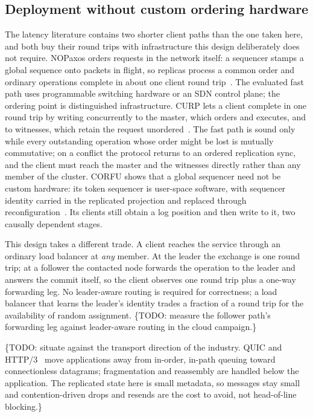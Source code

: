 \documentclass[10pt,journal,letterpaper]{IEEEtran}
\begin{document}
\subsection{Deployment without custom ordering hardware}
The latency literature contains two shorter client paths than the one taken
here, and both buy their round trips with infrastructure this design
deliberately does not require.
NOPaxos orders requests in the network itself: a sequencer stamps a global
sequence onto packets in flight, so replicas process a common order and
ordinary operations complete in about one client round trip~\cite{nopaxos}.
The evaluated fast path uses programmable switching hardware or an SDN
control plane; the ordering point is distinguished infrastructure.
CURP lets a client complete in one round trip by writing concurrently to the
master, which orders and executes, and to witnesses, which retain the request
unordered~\cite{curp}. The fast path is sound only while every outstanding
operation whose order might be lost is mutually commutative; on a conflict
the protocol returns to an ordered replication sync, and the client must
reach the master and the witnesses directly rather than any member of the
cluster.
CORFU shows that a global sequencer need not be custom hardware: its token
sequencer is user-space software, with sequencer identity carried in the
replicated projection and replaced through reconfiguration~\cite{corfu}.
Its clients still obtain a log position and then write to it, two causally
dependent stages.

This design takes a different trade. A client reaches the service through an
ordinary load balancer at \emph{any} member. At the leader the exchange is
one round trip; at a follower the contacted node forwards the operation to
the leader and answers the commit itself, so the client observes one round
trip plus a one-way forwarding leg. No leader-aware routing is required for
correctness; a load balancer that learns the leader's identity trades a
fraction of a round trip for the availability of random assignment.
\{TODO: measure the follower path's forwarding leg against leader-aware
routing in the cloud campaign.\}

\{TODO: situate against the transport direction of the industry. QUIC and
HTTP/3~\cite{rfc9000,rfc9114} move applications away from in-order,
in-path queuing toward connectionless datagrams; fragmentation and
reassembly are handled below the application. The replicated state here is
small metadata, so messages stay small and contention-driven drops and
resends are the cost to avoid, not head-of-line blocking.\}
\end{document}
